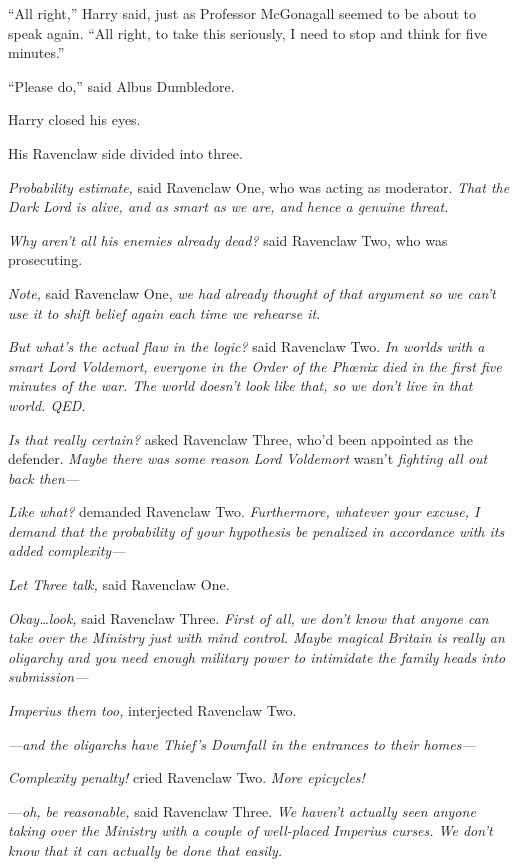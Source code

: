 “All right,” Harry said, just as Professor McGonagall seemed to be about to speak again. “All right, to take this seriously, I need to stop and think for five minutes.”

“Please do,” said Albus Dumbledore.

Harry closed his eyes.

His Ravenclaw side divided into three.

\emph{Probability estimate,} said Ravenclaw One, who was acting as moderator. \emph{That the Dark Lord is alive, and as smart as we are, and hence a genuine threat.}

\emph{Why aren’t all his enemies already dead?} said Ravenclaw Two, who was prosecuting.

\emph{Note,} said Ravenclaw One, \emph{we had already thought of that argument so we can’t use it to shift belief \emph{again} each time we rehearse it.}

\emph{But what’s the actual flaw in the logic?} said Ravenclaw Two. \emph{In worlds with a smart Lord Voldemort, everyone in the Order of the Phœnix died in the first five minutes of the war. The world doesn’t look like that, so we don’t live in that world. QED.}

\emph{Is that really certain?} asked Ravenclaw Three, who’d been appointed as the defender. \emph{Maybe there was some reason Lord Voldemort} wasn’t \emph{fighting all out back then—}

\emph{Like what?} demanded Ravenclaw Two. \emph{Furthermore, whatever your excuse, I demand that the probability of your hypothesis be penalized in accordance with its added complexity—}

\emph{Let Three talk,} said Ravenclaw One.

\emph{Okay…look,} said Ravenclaw Three. \emph{First of all, we don’t \emph{know} that anyone can take over the Ministry just with mind control. Maybe magical Britain is really an oligarchy and you need enough military power to intimidate the family heads into submission—}

\emph{Imperius them too,} interjected Ravenclaw Two.

\emph{—and the oligarchs have Thief’s Downfall in the entrances to \emph{their} homes—}

\emph{Complexity penalty!} cried Ravenclaw Two. \emph{More epicycles!}

—\emph{oh, be reasonable,} said Ravenclaw Three. \emph{We haven’t actually \emph{seen} anyone taking over the Ministry with a couple of well-placed Imperius curses. We don’t \emph{know} that it can actually be done that easily.}

